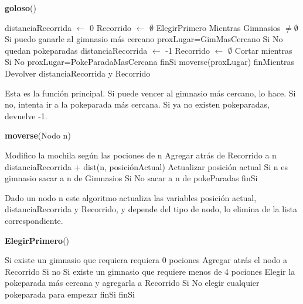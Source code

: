 \documentclass[spanish,12pt]{article}
\begin{document}
\begin{algorithm}[H]{\textbf{goloso}()}
	\begin{algorithmic}[1]
		\State distanciaRecorrida $\gets$ 0
		\State Recorrido $\gets$ $\emptyset$
		\State ElegirPrimero
		\State Mientras Gimnasios $\not= \emptyset$
		\State \quad Si puedo ganarle al gimnasio más cercano
		\State \qquad proxLugar=GimMasCercano
		\State \quad Si No quedan pokeparadas 
		\State \qquad distanciaRecorrida $\gets$ -1
		\State \qquad Recorrido $\gets$ $\emptyset$
		\State \qquad Cortar mientras
		\State \quad Si No
		\State \qquad proxLugar=PokeParadaMasCercana
		\State \quad finSi
		\State \quad moverse(proxLugar)
		\State finMientras
		\State Devolver distanciaRecorrida y Recorrido 
	\end{algorithmic}
\end{algorithm}

Esta es la función principal. Si puede vencer al gimnasio más cercano, lo hace. Si no, intenta ir a la pokeparada más cercana. Si ya no existen pokeparadas, devuelve -1.

\begin{algorithm}[H]{\textbf{moverse}(Nodo n)}
	\begin{algorithmic}[1]
		\State Modifico la mochila según las pociones de n
		\State Agregar atrás de Recorrido a n
		\State distanciaRecorrida + dist(n, posiciónActual)
		\State Actualizar posición actual
		\State Si n es gimnasio
		\State \quad sacar a n de Gimnasios
		\State Si No
		\State \quad sacar a n de pokeParadas
		\State finSi
	\end{algorithmic}
\end{algorithm}

Dado un nodo n este algoritmo actualiza las variables posición actual, distanciaRecorrida y Recorrido, y depende del tipo de nodo, lo elimina de la lista correspondiente.

\begin{algorithm}[H]{\textbf{ElegirPrimero}()}
	\begin{algorithmic}[1]
	\State Si existe un gimnasio que requiera requiera 0 pociones 
	\State \quad Agregar atrás el nodo a Recorrido
	\State Si no
	\State \quad Si existe un gimnasio que requiere menos de 4 pociones
	\State \qquad Elegir la pokeparada más cercana y agregarla a Recorrido
	\State \quad Si No 
	\State \qquad elegir cualquier pokeparada para empezar
	\State \quad finSi
	\State finSi
	\end{algorithmic}
\end{algorithm}
\end{document}
